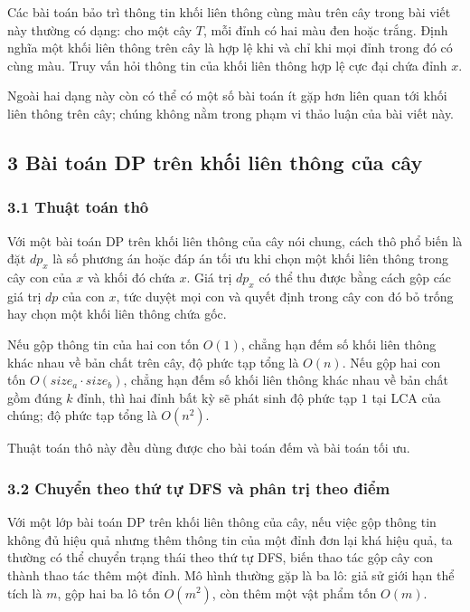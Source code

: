 \documentclass[11pt]{article}
\begin{document}
Các bài toán bảo trì thông tin khối liên thông cùng màu trên cây trong bài viết
này thường có dạng: cho một cây \(T\), mỗi đỉnh có hai màu đen hoặc trắng. Định
nghĩa một khối liên thông trên cây là hợp lệ khi và chỉ khi mọi đỉnh trong đó
có cùng màu. Truy vấn hỏi thông tin của khối liên thông hợp lệ cực đại chứa
đỉnh \(x\).

Ngoài hai dạng này còn có thể có một số bài toán ít gặp hơn liên quan tới khối
liên thông trên cây; chúng không nằm trong phạm vi thảo luận của bài viết này.

\subsection*{3 Bài toán DP trên khối liên thông của cây}

\subsubsection*{3.1 Thuật toán thô}

Với một bài toán DP trên khối liên thông của cây nói chung, cách thô phổ biến là
đặt \(dp_x\) là số phương án hoặc đáp án tối ưu khi chọn một khối liên thông
trong cây con của \(x\) và khối đó chứa \(x\). Giá trị \(dp_x\) có thể thu được
bằng cách gộp các giá trị \(dp\) của con \(x\), tức duyệt mọi con và quyết định
trong cây con đó bỏ trống hay chọn một khối liên thông chứa gốc.

Nếu gộp thông tin của hai con tốn \(O(1)\), chẳng hạn đếm số khối liên thông
khác nhau về bản chất trên cây, độ phức tạp tổng là \(O(n)\). Nếu gộp hai con
tốn \(O(size_a\cdot size_b)\), chẳng hạn đếm số khối liên thông khác nhau về
bản chất gồm đúng \(k\) đỉnh, thì hai đỉnh bất kỳ sẽ phát sinh độ phức tạp \(1\)
tại LCA của chúng; độ phức tạp tổng là \(O(n^2)\).

Thuật toán thô này đều dùng được cho bài toán đếm và bài toán tối ưu.

\subsubsection*{3.2 Chuyển theo thứ tự DFS và phân trị theo điểm}

Với một lớp bài toán DP trên khối liên thông của cây, nếu việc gộp thông tin
không đủ hiệu quả nhưng thêm thông tin của một đỉnh đơn lại khá hiệu quả, ta
thường có thể chuyển trạng thái theo thứ tự DFS, biến thao tác gộp cây con
thành thao tác thêm một đỉnh. Mô hình thường gặp là ba lô: giả sử giới hạn thể
tích là \(m\), gộp hai ba lô tốn \(O(m^2)\), còn thêm một vật phẩm tốn \(O(m)\).
\end{document}
